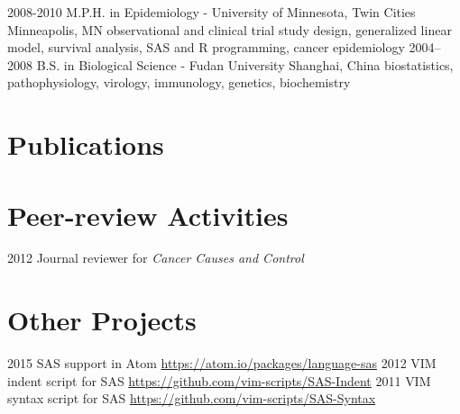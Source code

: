 \documentclass[11pt, print]{friggeri-cv}
\begin{document}
\begin{entrylist}
  \entry
    {2008-2010}
    {M.P.H. in Epidemiology - University of Minnesota, Twin Cities}
    {Minneapolis, MN}
    {observational and clinical trial study design, generalized linear model, survival analysis, SAS and R programming, cancer epidemiology}
  \entry
    {2004–2008}
    {B.S. in Biological Science - Fudan University}
    {Shanghai, China}
    {biostatistics, pathophysiology, virology, immunology, genetics, biochemistry}
\end{entrylist}

\clearpage

\section{Publications}


\section{Peer-review Activities}

\begin{entrylist}
  \simpleentry
    {2012}
    {Journal reviewer for \textit{Cancer Causes and Control}}
    {}
\end{entrylist}

\section{Other Projects}

\begin{entrylist}
  \simpleentry
    {2015}
    {SAS support in Atom}
    {\href{https://atom.io/packages/language-sas}{https://atom.io/packages/language-sas}}
  \simpleentry
    {2012}
    {VIM indent script for SAS}
    {\href{https://github.com/vim-scripts/SAS-Indent}{https://github.com/vim-scripts/SAS-Indent}}
  \simpleentry
    {2011}
    {VIM syntax script for SAS}
    {\href{https://github.com/vim-scripts/SAS-Syntax}{https://github.com/vim-scripts/SAS-Syntax}}
\end{entrylist}
\end{document}
